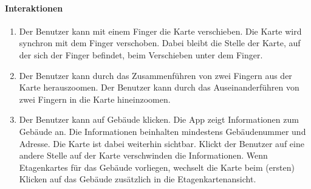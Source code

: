 \paragraph{Interaktionen}
\begin{enumerate}[start=12, label=\textbf{/FA\arabic*/}, align=left]
    \item Der \Gls{Benutzer} kann mit einem Finger die \Gls{Karte} verschieben. Die \Gls{Karte} wird synchron mit dem Finger verschoben. Dabei bleibt die Stelle der \Gls{Karte}, auf der sich der Finger befindet, beim Verschieben unter dem Finger.
    \item Der \Gls{Benutzer} kann durch das Zusammenführen von zwei Fingern aus der \Gls{Karte} herauszoomen. Der \Gls{Benutzer} kann durch das Auseinanderführen von zwei Fingern in die \Gls{Karte} hineinzoomen.
    \item Der \Gls{Benutzer} kann auf Gebäude klicken. Die App zeigt Informationen zum Gebäude an. 
    Die Informationen beinhalten mindestens Gebäudenummer und Adresse. Die \Gls{Karte} ist dabei weiterhin sichtbar. 
    Klickt der \Gls{Benutzer} auf eine andere Stelle auf der \Gls{Karte} verschwinden die Informationen. 
    Wenn \Glspl{Etagenkarte} für das Gebäude vorliegen, wechselt die \Gls{Karte} beim (ersten) Klicken auf das Gebäude zusätzlich in die \Gls{Etagenkartenansicht}.
\end{enumerate}